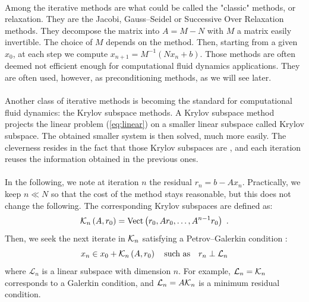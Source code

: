       \paragraph{}
      Among the iterative methods are what could be called the "classic" methods, or relaxation.
      They are the Jacobi, Gauss--Seidel or Successive Over Relaxation methods.
      They decompose the matrix into $A = M - N$ with $M$ a matrix easily invertible.
      The choice of $M$ depends on the method.
      Then, starting from a given $x_0$, at each step we compute $x_{n+1} = M^{-1} \left( N x_n + b \right)$.
      Those methods are often deemed not efficient enough for computational fluid dynamics applications.
      They are often used, however, as preconditioning methods, as we will see later.

      \paragraph{}
      Another class of iterative methods is becoming the standard for computational fluid dynamics: the Krylov subspace methods.
      A Krylov subspace method projects the linear problem (\ref{eq:linear}) on a smaller linear subspace called Krylov subspace.
      The obtained smaller system is then solved, much more easily.
      The cleverness resides in the fact that those Krylov subspaces are , and each iteration reuses the information obtained in the previous ones.

      \paragraph{}
      In the following, we note at iteration $n$ the residual $r_n = b - A x_n$.
      Practically, we keep $n \ll N$ so that the cost of the method stays reasonable, but this does not change the following.
      The corresponding Krylov subspaces are defined as:
  		\begin{equation}
  			\krylov[A, r_0]{n} = \operatorname{Vect}\left( r_0, A r_0, \dots, A^{n-1} r_0 \right) \ .
  		\end{equation}
      Then, we seek the next iterate in $\krylov{n}$ satisfying a Petrov--Galerkin condition \cite{SimonciniSzyld2007}:
  		\begin{equation}
  			x_n \in x_0 + \krylov[A, r_0]{n} \quad \textrm{such as} \quad r_n \perp \mathcal{L}_n
  		\end{equation}
      where $\mathcal{L}_n$ is a linear subspace with dimension $n$.
      For example, $\mathcal{L}_n = \krylov{n}$ corresponds to a Galerkin condition, and $\mathcal{L}_n = A \krylov{n}$ is a minimum residual condition.

